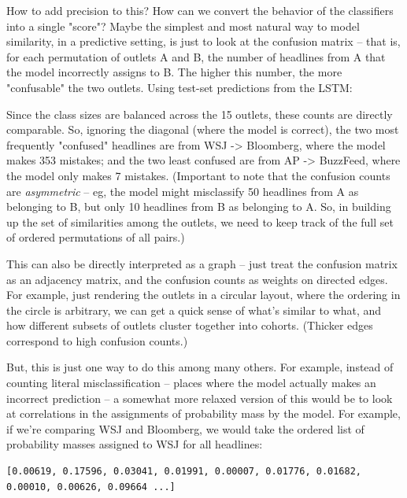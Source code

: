 \documentclass{scrartcl}
\begin{document}

How to add precision to this? How can we convert the behavior of the classifiers into a single "score"? Maybe the simplest and most natural way to model similarity, in a predictive setting, is just to look at the confusion matrix -- that is, for each permutation of outlets A and B, the number of headlines from A that the model incorrectly assigns to B. The higher this number, the more "confusable" the two outlets. Using test-set predictions from the LSTM:


Since the class sizes are balanced across the 15 outlets, these counts are directly comparable. So, ignoring the diagonal (where the model is correct), the two most frequently "confused" headlines are from WSJ -> Bloomberg, where the model makes 353 mistakes; and the two least confused are from AP -> BuzzFeed, where the model only makes 7 mistakes. (Important to note that the confusion counts are \textit{asymmetric} -- eg, the model might misclassify 50 headlines from A as belonging to B, but only 10 headlines from B as belonging to A. So, in building up the set of similarities among the outlets, we need to keep track of the full set of ordered permutations of all pairs.)

This can also be directly interpreted as a graph -- just treat the confusion matrix as an adjacency matrix, and the confusion counts as weights on directed edges. For example, just rendering the outlets in a circular layout, where the ordering in the circle is arbitrary, we can get a quick sense of what's similar to what, and how different subsets of outlets cluster together into cohorts. (Thicker edges correspond to high confusion counts.)


But, this is just one way to do this among many others. For example, instead of counting literal misclassification -- places where the model actually makes an incorrect prediction -- a somewhat more relaxed version of this would be to look at correlations in the assignments of probability mass by the model. For example, if we're comparing WSJ and Bloomberg, we would take the ordered list of probability masses assigned to WSJ for all headlines:

\begin{lstlisting}
[0.00619, 0.17596, 0.03041, 0.01991, 0.00007, 0.01776, 0.01682, 0.00010, 0.00626, 0.09664 ...]
\end{lstlisting}
\end{document}
